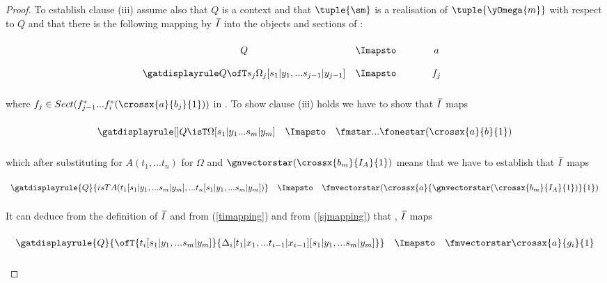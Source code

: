 \begin{proof}
To establish clause (iii) assume also  that $Q$ is a context and that $\tuple{\sm}$ is a realisation of $\tuple{\yOmega{m}}$ with respect to $Q$
and that there is the following mapping by $\Ibar$ into the objects and sections of \catc:
\begin{equation}
\label{sjmapping}
\begin{array}{c c c}
\forceSOURCEwidth & & \forceTARGETwidth \\ [-0.1cm]
Q          & \Imapsto & a   \\ [0.4cm]
\sjrule    & \Imapsto & f_j \\ [0.4cm]
\end{array}
\end{equation}
where $f_j \in Sect(f_{j-1}^*...f_i^*(\crossx{a}{b_j}{1}))$ in \catc.
To show clause (iii) holds we have to show that $\Ibar$ maps 
\begin{equation}
\begin{array}{c c c}
\forceSOURCEwidth & & \forceTARGETwidth \\ [-0.1cm]
\omegarulesubstituted    & \Imapsto & \fmstar...\fonestar (\crossx{a}{b}{1}) \\ [0.4cm]
\end{array}
\end{equation}
which after substituting for $A(t_1,...t_n)$ for $\Omega$ and $\gnvectorstar(\crossx{b_m}{I_A}{1})$ means that we
have to establish that $\Ibar$ maps
\begin{equation}
\label{clauseiiirequiredmapping}
\begin{array}{c c c}
\forceSOURCEwidth & & \forceTARGETwidth \\ [-0.1cm]
\gatdisplayrule{Q}{isT{A(t_1[\ssubbedfory],...t_n[\ssubbedfory])}}   & \Imapsto & \fmvectorstar (\crossx{a}{\gnvectorstar(\crossx{b_m}{I_A}{1})}{1}) \\ [0.4cm]
\end{array}
\end{equation}
It can deduce from the definition of $\Ibar$ and from (\ref{timapping}) and from (\ref{sjmapping}) that \foreachi, $\Ibar$ maps
\begin{equation}
\begin{array}{c c c}
\forceSOURCEwidth & & \forceTARGETwidth \\ [-0.1cm]
\gatdisplayrule{Q}{\ofT{t_i[\ssubbedfory]}{\Delta_i[t_1 | x_1,...t_{i-1}|x_{i-1}][\ssubbedfory]}}  & \Imapsto & \fmvectorstar \crossx{a}{g_i}{1} \\ [0.4cm]
\end{array}
\end{equation}

\end{proof}
